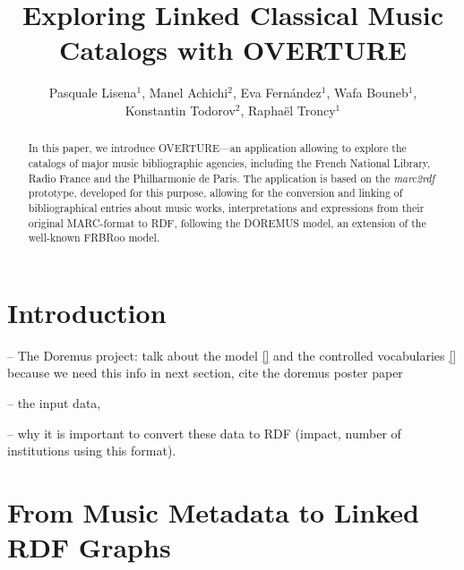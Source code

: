 \documentclass[runningheads,a4paper]{llncs}
\begin{document}
\title{Exploring Linked Classical Music Catalogs with OVERTURE}

\author{Pasquale Lisena$^1$, Manel Achichi$^2$, Eva Fern\'{a}ndez$^1$, Wafa Bouneb$^1$, \\ Konstantin Todorov$^2$, Rapha\"{e}l Troncy$^1$}

\maketitle


\begin{abstract}
In this paper, we introduce OVERTURE---an application allowing to explore the catalogs of major music bibliographic agencies, including the French National Library, Radio France and the Philharmonie de Paris. The application is based on the {\it marc2rdf} prototype, developed for this purpose, allowing for the conversion and linking of bibliographical entries about music works, interpretations and expressions from their original MARC-format to RDF, following the DOREMUS model, an extension of the well-known FRBRoo model.
\end{abstract}


\section{Introduction}
\label{sec:introduction}

-- The Doremus project: talk about the model \ref{} and the controlled vocabularies \ref{} because we need this info in next section, cite the doremus poster paper \cite{achichi2015doremus}

-- the input data,

-- why it is important to convert these data to RDF (impact, number of institutions using this format).



\section{From Music Metadata to Linked RDF Graphs}
\label{sec:conversion}
\end{document}

